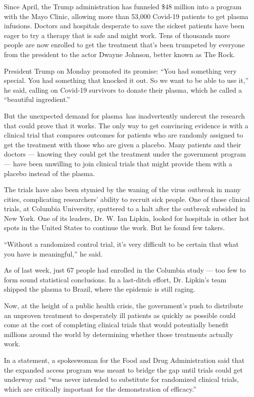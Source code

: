 Since April, the Trump administration has funneled \$48 million into a
program with the Mayo Clinic, allowing more than 53,000 Covid-19
patients to get plasma infusions. Doctors and hospitals desperate to
save the sickest patients have been eager to try a therapy that is safe
and might work. Tens of thousands more people are now enrolled to get
the treatment that's been trumpeted by everyone from the president to
the actor Dwayne Johnson, better known as The Rock.

President Trump on Monday promoted its promise: ``You had something very
special. You had something that knocked it out. So we want to be able to
use it,'' he said, calling on Covid-19 survivors to donate their plasma,
which he called a ``beautiful ingredient.''

But the unexpected demand for plasma~has inadvertently undercut the
research that could prove that it works. The only way to get convincing
evidence is with a clinical trial that compares outcomes for patients
who are randomly assigned to get the treatment with those who are given
a placebo. Many patients and their doctors --- knowing they could get
the treatment under the government program --- have been unwilling to
join clinical trials that might provide them with a placebo instead of
the plasma.

The trials have also been stymied by the waning of the virus outbreak in
many cities, complicating researchers' ability to recruit sick people.
One of those clinical trials, at Columbia University, sputtered to a
halt after the outbreak subsided in New York. One of its leaders, Dr. W.
Ian Lipkin, looked for hospitals in other hot spots in the United States
to continue the work. But he found few takers.

``Without a randomized control trial, it's very difficult to be certain
that what you have is meaningful,'' he said.

As of last week, just 67 people had enrolled in the Columbia study ---
too few to form sound statistical conclusions. In a last-ditch effort,
Dr. Lipkin's team shipped the plasma to Brazil, where the epidemic is
still raging.

Now, at the height of a public health crisis, the government's push to
distribute an unproven treatment to desperately ill patients as quickly
as possible could come at the cost of completing clinical trials that
would potentially benefit millions around the world by determining
whether those treatments actually work.

In a statement, a spokeswoman for the Food and Drug Administration said
that the expanded access program was meant to bridge the gap until
trials could get underway and ``was never intended to substitute for
randomized clinical trials, which are critically important for the
demonstration of efficacy.''

